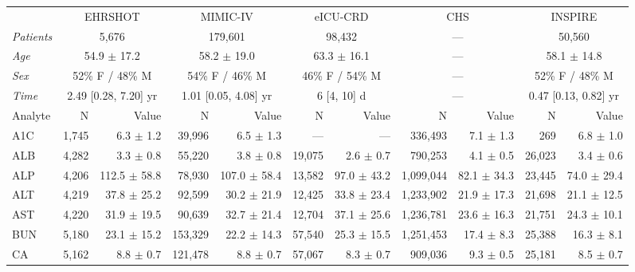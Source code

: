 \begin{table}[ht]
\centering
\scriptsize
\begin{tabular}{lrrrrrrrrrr}
\toprule
  & \multicolumn{2}{c}{EHRSHOT} & \multicolumn{2}{c}{MIMIC-IV} & \multicolumn{2}{c}{eICU-CRD} & \multicolumn{2}{c}{CHS} & \multicolumn{2}{c}{INSPIRE} \\
\cmidrule(lr){2-3} \cmidrule(lr){4-5} \cmidrule(lr){6-7} \cmidrule(lr){8-9} \cmidrule(lr){10-11}
\textit{Patients} & \multicolumn{2}{c}{5,676} & \multicolumn{2}{c}{179,601} & \multicolumn{2}{c}{98,432} & \multicolumn{2}{c}{---} & \multicolumn{2}{c}{50,560} \\
\textit{Age} & \multicolumn{2}{c}{54.9 $\pm$ 17.2} & \multicolumn{2}{c}{58.2 $\pm$ 19.0} & \multicolumn{2}{c}{63.3 $\pm$ 16.1} & \multicolumn{2}{c}{---} & \multicolumn{2}{c}{58.1 $\pm$ 14.8} \\
\textit{Sex} & \multicolumn{2}{c}{52\% F / 48\% M} & \multicolumn{2}{c}{54\% F / 46\% M} & \multicolumn{2}{c}{46\% F / 54\% M} & \multicolumn{2}{c}{---} & \multicolumn{2}{c}{52\% F / 48\% M} \\
\textit{Time} & \multicolumn{2}{c}{2.49 [0.28, 7.20] yr} & \multicolumn{2}{c}{1.01 [0.05, 4.08] yr} & \multicolumn{2}{c}{6 [4, 10] d} & \multicolumn{2}{c}{---} & \multicolumn{2}{c}{0.47 [0.13, 0.82] yr} \\
\midrule
Analyte & N & Value & N & Value & N & Value & N & Value & N & Value \\
\midrule
A1C & 1,745 & 6.3 $\pm$ 1.2 & 39,996 & 6.5 $\pm$ 1.3 & --- & --- & 336,493 & 7.1 $\pm$ 1.3 & 269 & 6.8 $\pm$ 1.0 \\
ALB & 4,282 & 3.3 $\pm$ 0.8 & 55,220 & 3.8 $\pm$ 0.8 & 19,075 & 2.6 $\pm$ 0.7 & 790,253 & 4.1 $\pm$ 0.5 & 26,023 & 3.4 $\pm$ 0.6 \\
ALP & 4,206 & 112.5 $\pm$ 58.8 & 78,930 & 107.0 $\pm$ 58.4 & 13,582 & 97.0 $\pm$ 43.2 & 1,099,044 & 82.1 $\pm$ 34.3 & 23,445 & 74.0 $\pm$ 29.4 \\
ALT & 4,219 & 37.8 $\pm$ 25.2 & 92,599 & 30.2 $\pm$ 21.9 & 12,425 & 33.8 $\pm$ 23.4 & 1,233,902 & 21.9 $\pm$ 17.3 & 21,698 & 21.1 $\pm$ 12.5 \\
AST & 4,220 & 31.9 $\pm$ 19.5 & 90,639 & 32.7 $\pm$ 21.4 & 12,704 & 37.1 $\pm$ 25.6 & 1,236,781 & 23.6 $\pm$ 16.3 & 21,751 & 24.3 $\pm$ 10.1 \\
BUN & 5,180 & 23.1 $\pm$ 15.2 & 153,329 & 22.2 $\pm$ 14.3 & 57,540 & 25.3 $\pm$ 15.5 & 1,251,453 & 17.4 $\pm$ 8.3 & 25,388 & 16.3 $\pm$ 8.1 \\
CA & 5,162 & 8.8 $\pm$ 0.7 & 121,478 & 8.8 $\pm$ 0.7 & 57,067 & 8.3 $\pm$ 0.7 & 909,036 & 9.3 $\pm$ 0.5 & 25,181 & 8.5 $\pm$ 0.7 \\

\end{tabular}
\end{table}
